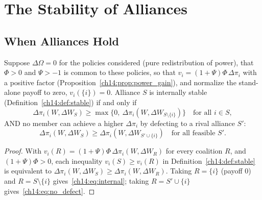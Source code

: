 \documentclass[../structural_economics_book.tex]{subfiles}
\begin{document}
\section{The Stability of Alliances}
\label{ch14:sec:stability}

\subsection{When Alliances Hold}

\begin{proposition}\label{ch14:prop:alliance_stability}
Suppose $\Delta\Omega = 0$ for the policies considered (pure redistribution of power), that $\Phi > 0$ and $\Psi > -1$ is common to these policies, so that $v_i = (1+\Psi)\Phi\,\Delta\pi_i$ with a positive factor (Proposition~\ref{ch14:prop:power_gain}), and normalize the stand-alone payoff to zero, $v_i(\{i\}) = 0$. Alliance $S$ is internally stable (Definition~\ref{ch14:def:stable}) if and only if
\begin{equation}\label{ch14:eq:internal}
\Delta\pi_i(W, \Delta W_S) \geq \max\big\{0,\ \Delta\pi_i(W, \Delta W_{S\setminus\{i\}})\big\} \quad \text{for all } i \in S,
\end{equation}
AND no member can achieve a higher $\Delta\pi_i$ by defecting to a rival alliance $S'$:
\begin{equation}\label{ch14:eq:no_defect}
\Delta\pi_i(W, \Delta W_S) \geq \Delta\pi_i(W, \Delta W_{S' \cup \{i\}}) \quad \text{for all feasible } S'.
\end{equation}
\end{proposition}

\begin{proof}
With $v_i(R) = (1+\Psi)\Phi\,\Delta\pi_i(W, \Delta W_R)$ for every coalition $R$, and $(1+\Psi)\Phi > 0$, each inequality $v_i(S) \geq v_i(R)$ in Definition~\ref{ch14:def:stable} is equivalent to $\Delta\pi_i(W, \Delta W_S) \geq \Delta\pi_i(W, \Delta W_R)$. Taking $R = \{i\}$ (payoff $0$) and $R = S\setminus\{i\}$ gives~\eqref{ch14:eq:internal}; taking $R = S' \cup \{i\}$ gives~\eqref{ch14:eq:no_defect}.
\end{proof}
\end{document}
